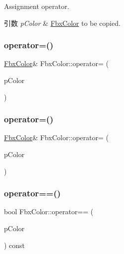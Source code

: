 Assignment operator. 
\begin{DoxyParams}{引数}
{\em p\+Color} & \hyperlink{class_fbx_color}{Fbx\+Color} to be copied. \\
\hline
\end{DoxyParams}
\mbox{\label{class_fbx_color_af509c1a34ba01aca1207975fa36ebc07}} 
\subsubsection{\texorpdfstring{operator=()}{operator=()}\hspace{0.1cm}{\footnotesize\ttfamily [2/3]}}
{\footnotesize\ttfamily \hyperlink{class_fbx_color}{Fbx\+Color}\& Fbx\+Color\+::operator= (\begin{DoxyParamCaption}\item[{const \hyperlink{fbxtypes_8h_ae0a96f14cde566774c7553aa7523b7a7}{Fbx\+Double3} \&}]{p\+Color }\end{DoxyParamCaption})}

\mbox{\label{class_fbx_color_a5398fb758068706d35318cd145092c0f}} 
\subsubsection{\texorpdfstring{operator=()}{operator=()}\hspace{0.1cm}{\footnotesize\ttfamily [3/3]}}
{\footnotesize\ttfamily \hyperlink{class_fbx_color}{Fbx\+Color}\& Fbx\+Color\+::operator= (\begin{DoxyParamCaption}\item[{const \hyperlink{fbxtypes_8h_a03dddc7979e0016f74a095b1943d97a3}{Fbx\+Double4} \&}]{p\+Color }\end{DoxyParamCaption})}

\mbox{\label{class_fbx_color_abba90fcb84b470c432abae17c2e1a347}} 
\subsubsection{\texorpdfstring{operator==()}{operator==()}}
{\footnotesize\ttfamily bool Fbx\+Color\+::operator== (\begin{DoxyParamCaption}\item[{const \hyperlink{class_fbx_color}{Fbx\+Color} \&}]{p\+Color }\end{DoxyParamCaption}) const}


